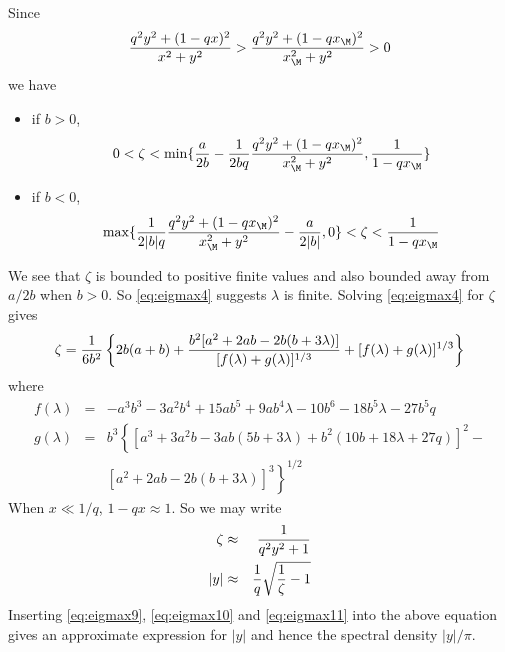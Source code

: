 Since
\begin{equation*}
  \frac{q^2 y^2+(1-q x)^2}{x^2+y^2} >
  \frac{q^2 y^2+(1-q x_\M)^2}{x_\M^2+y^2} > 0
\end{equation*}
we have
\begin{itemize}
\item if $b > 0$, 
  \begin{equation*}
    0 < \zeta < \min\{{a \over 2b} - {1 \over 2bq}\frac{q^2 y^2+(1-q
      x_\M)^2}{x_\M^2+y^2}, \frac{1}{1-qx_\M}\}
  \end{equation*}
\item if $b < 0$,
  \begin{equation*}
    \max\{{1 \over 2|b|q}\frac{q^2 y^2+(1-q
      x_\M)^2}{x_\M^2+y^2}-\frac{a}{2|b|}, 0\} < \zeta < \frac{1}{1-qx_\M}
  \end{equation*}
\end{itemize}
We see that $\zeta$ is bounded to positive finite values and also
bounded away from $a/2b$ when $b > 0$. So \eqref{eq:eigmax4} suggests
$\lambda$ is finite. Solving \eqref{eq:eigmax4} for $\zeta$ gives
\begin{equation}
  \label{eq:eigmax12}
  \zeta = {1 \over 6b^2} \left\{
    2b(a+b) + \frac{b^2[a^2+2 a b-2 b (b+3
      \lambda)]}{[f(\lambda) + g(\lambda)]^{1/3}} + [f(\lambda) +
    g(\lambda)]^{1/3}\right\}
\end{equation}
where
\begin{eqnarray}
  f(\lambda) &=& -a^3 b^3-3 a^2 b^4+15 a b^5+9 a b^4 \lambda -10
  b^6-18 b^5 \lambda -27 b^5 q \label{eq:eigmax10} \\
  g(\lambda) &=& b^3 \left\{[a^3+3 a^2 b-3 a b (5 b+3
        \lambda )+b^2 (10 b+18 \lambda +27 q)]^2-\right. \nonumber \\
    && \left.[a^2+2 a b-2 b (b+3 \lambda )]^3\right\}^{1/2} \label{eq:eigmax11}
\end{eqnarray}
When $x \ll 1/q$, $1-qx \approx 1$. So we may write
\begin{eqnarray*}
  \zeta &\approx& {1 \over q^2 y^2 + 1} \\
  |y| &\approx& {1 \over q}\sqrt{{1 \over \zeta} - 1}
\end{eqnarray*}
Inserting \eqref{eq:eigmax9}, \eqref{eq:eigmax10} and
\eqref{eq:eigmax11} into the above equation gives an approximate
expression for $|y|$ and hence the spectral density $|y|/\pi$.

